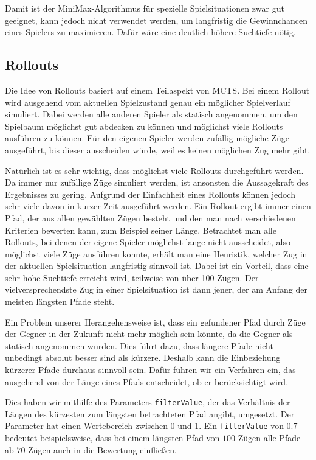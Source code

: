 \documentclass[12pt,a4paper]{article}
\begin{document}
Damit ist der MiniMax-Algorithmus für spezielle Spielsituationen zwar gut geeignet, kann jedoch nicht verwendet werden, um langfristig die Gewinnchancen eines Spielers zu maximieren. Dafür wäre eine deutlich höhere Suchtiefe nötig. 

 

\subsection{Rollouts} \label{sec:rollouts}
Die Idee von Rollouts basiert auf einem Teilaspekt von MCTS. Bei einem Rollout wird ausgehend vom aktuellen Spielzustand genau ein möglicher Spielverlauf simuliert. Dabei werden alle anderen Spieler als statisch angenommen, um den Spielbaum möglichst gut abdecken zu können und möglichst viele Rollouts ausführen zu können. Für den eigenen Spieler werden zufällig mögliche Züge ausgeführt, bis dieser ausscheiden würde, weil es keinen möglichen Zug mehr gibt.

Natürlich ist es sehr wichtig, dass möglichst viele Rollouts durchgeführt werden. Da immer nur zufällige Züge simuliert werden, ist ansonsten die Aussagekraft des Ergebnisses zu gering. Aufgrund der Einfachheit eines Rollouts können jedoch sehr viele davon in kurzer Zeit ausgeführt werden. Ein Rollout ergibt immer einen Pfad, der aus allen gewählten Zügen besteht und den man nach verschiedenen Kriterien bewerten kann, zum Beispiel seiner Länge. Betrachtet man alle Rollouts, bei denen der eigene Spieler möglichst lange nicht ausscheidet, also möglichst viele Züge ausführen konnte, erhält man eine Heuristik, welcher Zug in der aktuellen Spielsituation langfristig sinnvoll ist. Dabei ist ein Vorteil, dass eine sehr hohe Suchtiefe erreicht wird, teilweise von über 100 Zügen. Der vielversprechendste Zug in einer Spielsituation ist dann jener, der am Anfang der meisten längsten Pfade steht.

Ein Problem unserer Herangehensweise ist, dass ein gefundener Pfad durch Züge der Gegner in der Zukunft nicht mehr möglich sein könnte, da die Gegner als statisch angenommen wurden. Dies führt dazu, dass längere Pfade nicht unbedingt absolut besser sind als kürzere. Deshalb kann die Einbeziehung kürzerer Pfade durchaus sinnvoll sein. Dafür führen wir ein Verfahren ein, das ausgehend von der Länge eines Pfads entscheidet, ob er berücksichtigt wird.

Dies haben wir mithilfe des Parameters \texttt{filterValue}, der das Verhältnis der Längen des kürzesten zum längsten betrachteten Pfad angibt, umgesetzt. Der Parameter hat einen Wertebereich zwischen 0 und 1. Ein \texttt{filterValue} von $0.7$ bedeutet beispielsweise, dass bei einem längsten Pfad von $100$ Zügen alle Pfade ab $70$ Zügen auch in die Bewertung einfließen.
\end{document}
